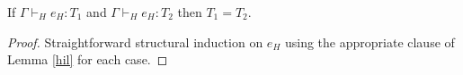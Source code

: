 \begin{huotl}
\label{huotl}
If $\Gamma\vdash_{H}e_{H}:T_{1}$ and $\Gamma\vdash_{H}e_{H}:T_{2}$ then $T_{1}=T_{2}$.
\begin{proof}
Straightforward structural induction on $e_{H}$ using the appropriate clause of Lemma \ref{hil} for each case.
\end{proof}
\end{huotl}